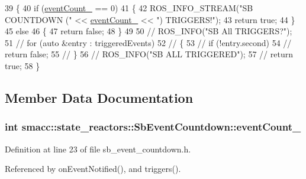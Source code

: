 \begin{DoxyCode}
39 \{
40     \textcolor{keywordflow}{if} (\hyperlink{classsmacc_1_1state__reactors_1_1SbEventCountdown_a24b2aef823bd43b9cb0e97cd5a600122}{eventCount\_} == 0)
41     \{
42         ROS\_INFO\_STREAM(\textcolor{stringliteral}{"SB COUNTDOWN ("} << \hyperlink{classsmacc_1_1state__reactors_1_1SbEventCountdown_a24b2aef823bd43b9cb0e97cd5a600122}{eventCount\_} << \textcolor{stringliteral}{") TRIGGERS!"});
43         \textcolor{keywordflow}{return} \textcolor{keyword}{true};
44     \}
45     \textcolor{keywordflow}{else}
46     \{
47         \textcolor{keywordflow}{return} \textcolor{keyword}{false};
48     \}
49 
50     \textcolor{comment}{// ROS\_INFO("SB All TRIGGERS?");}
51     \textcolor{comment}{// for (auto &entry : triggeredEvents)}
52     \textcolor{comment}{// \{}
53     \textcolor{comment}{//     if (!entry.second)}
54     \textcolor{comment}{//         return false;}
55     \textcolor{comment}{// \}}
56     \textcolor{comment}{// ROS\_INFO("SB ALL TRIGGERED");}
57     \textcolor{comment}{// return true;}
58 \}
\end{DoxyCode}


\subsection{Member Data Documentation}
\subsubsection[{\texorpdfstring{event\+Count\+\_\+}{eventCount_}}]{\setlength{\rightskip}{0pt plus 5cm}int smacc\+::state\+\_\+reactors\+::\+Sb\+Event\+Countdown\+::event\+Count\+\_\+\hspace{0.3cm}{\ttfamily [private]}}\hypertarget{classsmacc_1_1state__reactors_1_1SbEventCountdown_a24b2aef823bd43b9cb0e97cd5a600122}{}\label{classsmacc_1_1state__reactors_1_1SbEventCountdown_a24b2aef823bd43b9cb0e97cd5a600122}


Definition at line 23 of file sb\+\_\+event\+\_\+countdown.\+h.



Referenced by on\+Event\+Notified(), and triggers().

